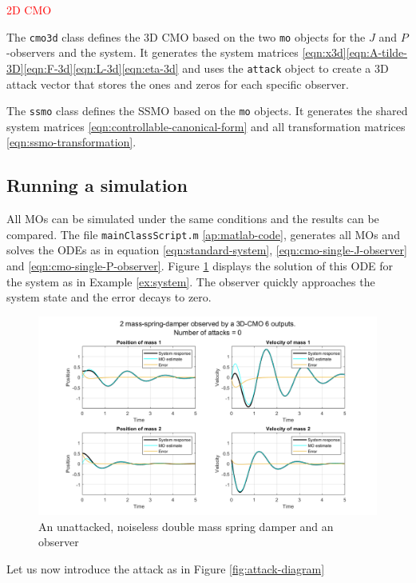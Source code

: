 \textcolor{red}{2D CMO}

The \texttt{cmo3d} class defines the 3D CMO based on the two \texttt{mo} objects for the $J$ and $P$-observers and the system. It generates the system matrices \eqref{eqn:x3d}\eqref{eqn:A-tilde-3D}\eqref{eqn:F-3d}\eqref{eqn:L-3d}\eqref{eqn:eta-3d} and uses the \texttt{attack} object to create a 3D attack vector that stores the ones and zeros for each specific observer.

The \texttt{ssmo} class defines the SSMO based on the \texttt{mo} objects. It generates the shared system matrices \eqref{eqn:controllable-canonical-form} and all transformation matrices \eqref{eqn:ssmo-transformation}. 

\subsection{Running a simulation}
All MOs can be simulated under the same conditions and the results can be compared. The file \texttt{mainClassScript.m} \ref{ap:matlab-code}, generates all MOs and solves the ODEs as in equation \eqref{eqn:standard-system}, \eqref{eqn:cmo-single-J-observer} and \eqref{eqn:cmo-single-P-observer}. Figure \ref{fig:unattacked-system-plot} displays the solution of this ODE for the system as in Example \ref{ex:system}. The observer quickly approaches the system state and the error decays to zero.

\begin{figure}[ht]
    \centering
    \includegraphics[width=\linewidth]{report/Figures/systemplot}
    \caption{An unattacked, noiseless double mass spring damper and an observer}
    \label{fig:unattacked-system-plot}
\end{figure}

Let us now introduce the attack as in Figure \ref{fig:attack-diagram}